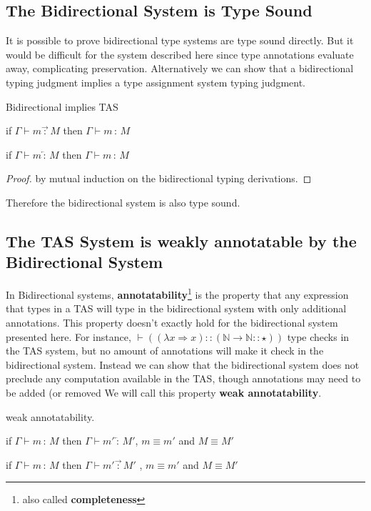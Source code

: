\subsection{The Bidirectional System is Type Sound}

It is possible to prove bidirectional type systems are type sound
directly\cite{nanevski2005dependent}. But it would be difficult for
the system described here since type annotations evaluate away, complicating
preservation. Alternatively we can show that a bidirectional typing
judgment implies a type assignment system typing judgment.
\begin{thm}
Bidirectional implies TAS

if $\Gamma\vdash m\overrightarrow{\,:\,}M$ then $\Gamma\vdash m\,:\,M$

if $\Gamma\vdash m\overleftarrow{\,:\,}M$ then $\Gamma\vdash m\,:\,M$
\end{thm}

\begin{proof}
by mutual induction on the bidirectional typing derivations. 
\end{proof}
Therefore the bidirectional system is also type sound.

\subsection{The TAS System is weakly annotatable by the Bidirectional System}

In Bidirectional systems, \textbf{annotatability}\footnote{also called \textbf{completeness}}
is the property that any expression that types in a TAS will type
in the bidirectional system with only additional annotations. This
property doesn't exactly hold for the bidirectional system presented
here. For instance, $\vdash\left((\lambda x\Rightarrow x)::\left(\mathbb{N}\rightarrow\mathbb{N}::\star\right)\right)$
type checks in the TAS system, but no amount of annotations will make
it check in the bidirectional system. Instead we can show that the
bidirectional system does not preclude any computation available in
the TAS, though annotations may need to be added (or removed%
We will call this property \textbf{weak annotatability}.
\begin{thm}
weak annotatability.

if $\Gamma\vdash m\,:\,M$ then $\Gamma\vdash m'\overleftarrow{\,:\,}M'$,
$m\equiv m'$ and $M\equiv M'$ 

if $\Gamma\vdash m\,:\,M$ then $\Gamma\vdash m'\overrightarrow{\,:\,}M'$
, $m\equiv m'$ and $M\equiv M'$ 
\end{thm}

